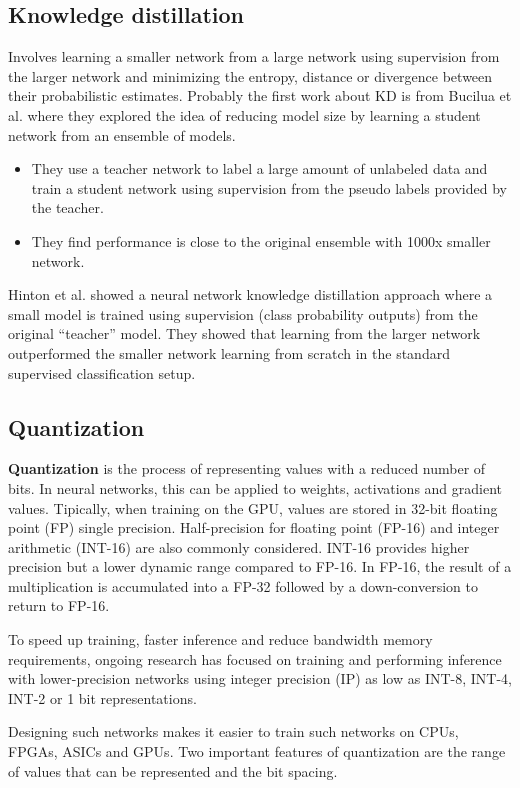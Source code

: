 \subsection{Knowledge distillation}
Involves learning a smaller network from a large network using supervision from the larger network and
minimizing the entropy, distance or divergence between their probabilistic estimates. Probably the
first work about KD is from Bucilua et al. where they explored the idea of reducing model size by
learning a student network from an ensemble of models.
\begin{itemize}
    \item They use a teacher network to label a large amount of unlabeled data and train a student
          network using supervision from the pseudo labels provided by the teacher.
    \item They find performance is close to the original ensemble with 1000x smaller network.
\end{itemize}

Hinton et al. showed a neural network knowledge distillation approach where a small model is trained
using supervision (class probability outputs) from the original “teacher” model. They showed that learning
from the larger network outperformed the smaller network learning from scratch in the standard supervised
classification setup.
\subsection{Quantization}
\textbf{Quantization} is the process of representing values with a reduced number of bits. In
neural networks, this can be applied to weights, activations and gradient values. Tipically, when
training on the GPU, values are stored in 32-bit floating point (FP) single precision. Half-precision
for floating point (FP-16) and integer arithmetic (INT-16) are also commonly considered. INT-16 provides
higher precision but a lower dynamic range compared to FP-16. In FP-16, the result of a multiplication
is accumulated into a FP-32 followed by a down-conversion to return to FP-16.

To speed up training, faster inference and reduce bandwidth memory requirements, ongoing research
has focused on training and performing inference with lower-precision networks using integer precision
(IP) as low as INT-8, INT-4, INT-2 or 1 bit representations.

Designing such networks makes it easier to train such networks on CPUs, FPGAs, ASICs and GPUs.
Two important features of quantization are the range of values that can be represented and the
bit spacing.

